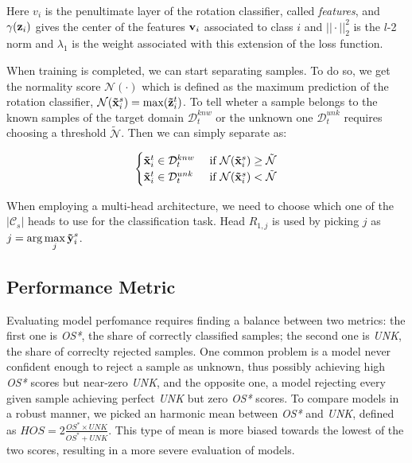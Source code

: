 \documentclass[10pt,twocolumn,letterpaper]{article}
\begin{document}
Here {\bf $v_i$} is the penultimate layer of the rotation classifier, called {\it features}, and $\gamma({\bf z}_i)$ gives the center of the features ${\bf v}_i$ associated to class $i$ and $||\cdot||_2^2$ is the $l$-2 norm and $\lambda_1$ is the weight associated with this extension of the loss function.

When training is completed, we can start separating samples.
To do so, we get the normality score $\mathcal{N}(\cdot)$ which is defined as the maximum prediction of the rotation classifier, $\mathcal{N}({\bf\tilde{x}}_i^s) = \max({\bf\tilde{z}}_i^t)$.
To tell wheter a sample belongs to the known samples of the target domain $\mathcal{D}_t^{knw}$ or the unknown one $\mathcal{D}_t^{unk}$ requires choosing a threshold $\tilde{\mathcal{N}}$.
Then we can simply separate as:

\begin{equation}
  \begin{cases}
    {\bf\tilde x}_i^t \in \mathcal{D}_t^{knw} & \text{ if } \mathcal{N}({\bf\tilde x}_i^s) \geq \tilde{\mathcal{N}} \\
    {\bf\tilde x}_i^t \in \mathcal{D}_t^{unk} & \text{ if } \mathcal{N}({\bf\tilde x}_i^s) < \tilde{\mathcal{N}}
  \end{cases}
\end{equation}
\label{eq:sample_separation}

When employing a multi-head architecture, we need to choose which one of the $|\mathcal{C}_s|$ heads to use for the classification task.
Head $R_{1,j}$ is used by picking $j$ as $\displaystyle j = \arg\max_j {\bf\tilde{y}}_i^s$.

\subsection{Performance Metric}
\label{sec:performance_metric}

Evaluating model perfomance requires finding a balance between two metrics:
the first one is {\it OS*}, the share of correctly classified samples;
the second one is {\it UNK}, the share of correclty rejected samples.
One common problem is a model never confident enough to reject a sample as unknown, thus possibly achieving high {\it OS*} scores but near-zero {\it UNK}, and the opposite one, a model rejecting every given sample achieving perfect {\it UNK} but zero {\it OS*} scores.
To compare models in a robust manner, we picked an harmonic mean between {\it OS*} and {\it UNK}, defined as $HOS = 2\frac{OS^*\times UNK}{OS^*+UNK}$.
This type of mean is more biased towards the lowest of the two scores, resulting in a more severe evaluation of models.
\end{document}
